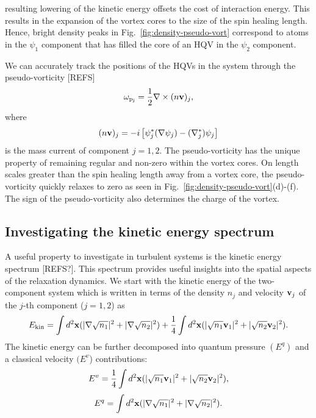 resulting lowering of the kinetic energy offsets the cost of interaction energy.
This results in the expansion of the vortex cores to the size of the spin
healing length.
Hence, bright density peaks in Fig.~\ref{fig:density-pseudo-vort} correspond to
atoms in the $\psi_1$ component that has filled the core of an HQV in the
$\psi_2$ component. \par
We can accurately track the positions of the HQVs in the system through
the pseudo-vorticity [REFS]
\begin{equation}
    \omega_\mathrm{p_j} = \frac{1}{2}\nabla \times (n\vb{v})_j,
\end{equation}
where
\begin{equation}
    (n\vb{v})_j = -i\left[\psi_j^*(\nabla\psi_j) - (\nabla_j^*)\psi_j\right]
\end{equation}
is the mass current of component $j=1, 2$.
The pseudo-vorticity has the unique property of remaining regular and non-zero
within the vortex cores. On length scales greater than the spin healing length
away from a vortex core, the pseudo-vorticity quickly relaxes to zero as seen
in Fig.~\ref{fig:density-pseudo-vort}(d)-(f).
The sign of the pseudo-vorticity also determines the charge of the vortex.

\subsection{Investigating the kinetic energy spectrum}
A useful property to investigate in turbulent systems is the kinetic energy
spectrum [REFS?].
This spectrum provides useful insights into the spatial aspects of the
relaxation dynamics.
We start with the kinetic energy of the two-component system which is written
in terms of the density $n_j$ and velocity $\vb{v}_j$ of the $j$-th
component ($j=1,2$) as
\begin{equation}
    E_\mathrm{kin} = \int d^2\vb{x} (|\nabla\sqrt{n_1}|^2 
    + |\nabla\sqrt{n_2}|^2)
    + \frac{1}{4}\int d^2\vb{x} (|\sqrt{n_1}\vb{v}_1|^2 
    + |\sqrt{n_2}\vb{v}_2|^2).
\end{equation}
The kinetic energy can be further decomposed into quantum pressure
$(E^q)$ and a classical velocity $(E^v$) contributions:
\begin{equation}
    E^v = \frac{1}{4}\int d^2\vb{x} (|\sqrt{n_1}\vb{v}_1|^2 
    + |\sqrt{n_2}\vb{v}_2|^2),
\end{equation}
\begin{equation}
    E^q = \int d^2\vb{x} (|\nabla\sqrt{n_1}|^2 
    + |\nabla\sqrt{n_2}|^2).
\end{equation}

